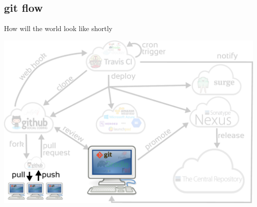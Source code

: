 \documentclass[presentation]{beamer}
\begin{document}
\subsection{git flow}

\begin{frame}[fragile]{How will the world look like shortly}
	\begin{center}
		\includegraphics[width=.9\textwidth]{images/ci-gitflow}
	\end{center}
\end{frame}
\end{document}
